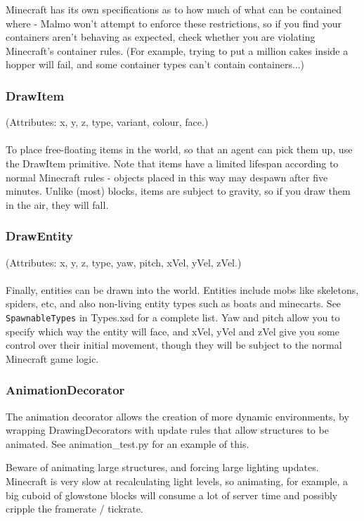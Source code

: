 \documentclass[11pt]{article} %
\begin{document}
Minecraft has its own specifications as to how much of what can be contained where - Malmo won't attempt to enforce these restrictions, so if you find your containers aren't behaving as expected, check whether you are violating Minecraft's container rules. (For example, trying to put a million cakes inside a hopper will fail, and some container types can't contain containers...)

\subsubsection{DrawItem}
(Attributes: x, y, z, type, variant, colour, face.)\\
\\
To place free-floating items in the world, so that an agent can pick them up, use the DrawItem primitive. Note that items have a limited lifespan according to normal Minecraft rules - objects placed in this way may despawn after five minutes. Unlike (most) blocks, items are subject to gravity, so if you draw them in the air, they will fall.

\subsubsection{DrawEntity}
(Attributes: x, y, z, type, yaw, pitch, xVel, yVel, zVel.)\\
\\
Finally, entities can be drawn into the world. Entities include mobs like skeletons, spiders, etc, and also non-living entity types such as boats and minecarts. See \lstinline!SpawnableTypes! in Types.xsd for a complete list. Yaw and pitch allow you to specify which way the entity will face, and xVel, yVel and zVel give you some control over their initial movement, though they will be subject to the normal Minecraft game logic.

\subsubsection{AnimationDecorator}
The animation decorator allows the creation of more dynamic environments, by wrapping DrawingDecorators with update rules that allow structures to be animated. See animation\_test.py for an example of this.

\begin{mdframed}[style=tipFrame]
Beware of animating large structures, and forcing large lighting updates. Minecraft is very slow at recalculating light levels, so animating, for example, a big cuboid of glowstone blocks will consume a lot of server time and possibly cripple the framerate / tickrate.
\end{mdframed}
\end{document}
